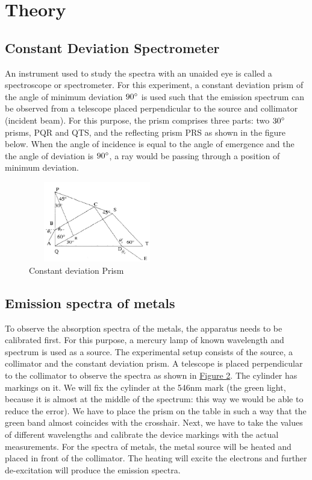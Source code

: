 \section{Theory}
\subsection{Constant Deviation Spectrometer}
An instrument used to study the spectra with an unaided eye is called a spectroscope or spectrometer. For this experiment, a constant deviation prism of the angle of minimum deviation $90 \degree$ is used such that the emission spectrum can be observed from a telescope placed perpendicular to the source and collimator (incident beam). For this purpose, the prism comprises three parts: two $30 \degree$ prisms, PQR and QTS, and the reflecting prism PRS as shown in the figure below. When the angle of incidence is equal to the angle of emergence and the
the angle of deviation is $90 \degree$, a ray would be passing through a position of minimum deviation. 

\begin{figure}[H]
\includegraphics[height=3.5cm, width=6cm]{images/2.png}
\caption{Constant deviation Prism}
\label{fig1}
\end{figure}

\subsection{Emission spectra of metals}
To observe the absorption spectra of the metals, the apparatus needs to be calibrated first. For this purpose, a mercury lamp of known wavelength and spectrum is used as a source. The experimental setup consists of the source, a collimator and the constant deviation prism. A telescope is placed perpendicular to the collimator to observe the spectra as shown in \hyperref[fig:2]{Figure 2}. The cylinder has markings on it. We will fix the cylinder at the 546nm mark (the green light, because it is almost at the middle of the spectrum: this way we would be able to reduce the error). We have to place the prism on the table in such a way that the green band almost coincides with the crosshair. Next, we have to take the values of different wavelengths and calibrate the device markings with the actual measurements. For the spectra of metals, the metal source will be heated and placed in front of the collimator. The heating will excite the electrons and further de-excitation will produce the emission spectra.


